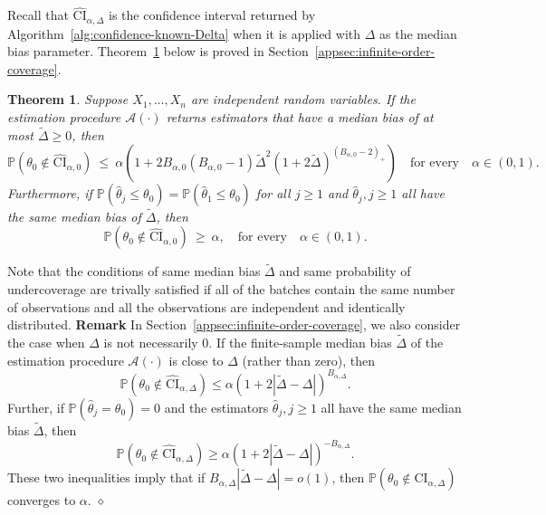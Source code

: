 \documentclass{article}
\newtheorem{thm}{Theorem}
\newcounter{myalgctr}
\newenvironment{rem}{%
   \vskip1mm\indent%
   \refstepcounter{myalgctr}%
   \textbf{Remark \themyalgctr}%
   }{\hfill$\diamond$\par}  %
\numberwithin{myalgctr}{section}
\begin{document}
Recall that $\widehat{\mathrm{CI}}_{\alpha,\Delta}$ is the confidence interval returned by Algorithm~\ref{alg:confidence-known-Delta} when it is applied with $\Delta$ as the median bias parameter. 
Theorem~\ref{thm:infinite-order-coverage} below is proved in Section~\ref{appsec:infinite-order-coverage}.
\begin{thm}\label{thm:infinite-order-coverage}
Suppose $X_1, \ldots, X_n$ are independent random variables. If the estimation procedure $\mathcal{A}(\cdot)$ returns estimators that have a median bias of at most $\widetilde{\Delta} \ge 0$,
then 
\begin{equation}\label{eq:some-order-coverage-upper-bound}
\mathbb{P}(\theta_0\notin\widehat{\mathrm{CI}}_{\alpha,0}) ~\le~ \alpha\left(1 + 2B_{\alpha,0}(B_{\alpha,0} - 1)\widetilde{\Delta}^2(1 + 2\widetilde{\Delta})^{(B_{\alpha,0} - 2)_+}\right)\quad\mbox{for every}\quad\alpha\in(0, 1).
\end{equation}
Furthermore, if $\mathbb{P}(\widehat{\theta}_j \le \theta_0) = \mathbb{P}(\widehat{\theta}_1 \le \theta_0)$ for all $j\ge1$ and $\widehat{\theta}_j, j\ge1$ all have the same median bias of $\widetilde{\Delta}$, then
\begin{equation}\label{eq:some-order-coverage-lower-bound}
\mathbb{P}(\theta_0 \notin \widehat{\mathrm{CI}}_{\alpha,0}) ~\ge~ \alpha,\quad\mbox{for every}\quad\alpha\in(0, 1).
\end{equation}
\end{thm}
{\color{black}Note that the conditions of same median bias $\widetilde{\Delta}$ and same probability of undercoverage are trivally satisfied if all of the batches contain the same number of observations and all the observations are independent and identically distributed. }%
\begin{rem}\label{rem:miscoverage-Delta}
In Section~\ref{appsec:infinite-order-coverage}, we also consider the case when $\Delta$ is not necessarily 0. 
If the finite-sample median bias $\widetilde{\Delta}$ of the estimation procedure $\mathcal{A}(\cdot)$ is close to $\Delta$ (rather than zero), then 
\[
\mathbb{P}(\theta_0 \notin \widehat{\mathrm{CI}}_{\alpha,\Delta}) \le \alpha\left(1 + 2|\widetilde{\Delta} - \Delta|\right)^{B_{\alpha,\Delta}}.
\]
Further, if $\mathbb{P}(\widehat{\theta}_j = \theta_0) = 0$ and the estimators $\widehat{\theta}_j, j\ge 1$ all have the same median bias $\widetilde{\Delta}$, then
\[
\mathbb{P}(\theta_0 \notin \widehat{\mathrm{CI}}_{\alpha,\Delta}) \ge \alpha\left(1 + 2|\widetilde{\Delta} - \Delta|\right)^{-B_{\alpha,\Delta}}.
\]
These two inequalities imply that if $B_{\alpha,\Delta}|\widetilde{\Delta} - \Delta| = o(1)$, then $\mathbb{P}(\theta_0\notin\widehat{\mathrm{CI}}_{\alpha,\Delta})$ converges to $\alpha$.
\end{rem}
\end{document}
